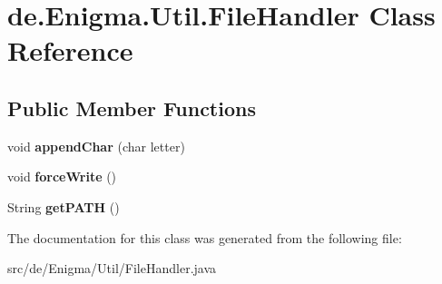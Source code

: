 \hypertarget{classde_1_1_enigma_1_1_util_1_1_file_handler}{}\section{de.\+Enigma.\+Util.\+File\+Handler Class Reference}
\label{classde_1_1_enigma_1_1_util_1_1_file_handler}
\subsection*{Public Member Functions}
\begin{DoxyCompactItemize}
\item 
\mbox{\label{classde_1_1_enigma_1_1_util_1_1_file_handler_a79a8f6db44470265e74f7b99c9894a14}} 
void {\bfseries append\+Char} (char letter)
\item 
\mbox{\label{classde_1_1_enigma_1_1_util_1_1_file_handler_a9683e0497063a3832805e4b516033d1b}} 
void {\bfseries force\+Write} ()
\item 
\mbox{\label{classde_1_1_enigma_1_1_util_1_1_file_handler_ace397e02b23a30baa565ec14395cef14}} 
String {\bfseries get\+P\+A\+TH} ()
\end{DoxyCompactItemize}


The documentation for this class was generated from the following file\+:\begin{DoxyCompactItemize}
\item 
src/de/\+Enigma/\+Util/File\+Handler.\+java\end{DoxyCompactItemize}

